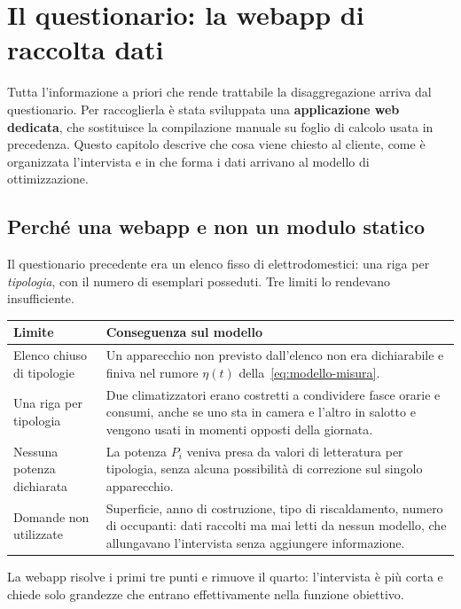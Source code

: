 \chapter{Il questionario: la webapp di raccolta dati}
\label{ch:questionario}

Tutta l'informazione a priori che rende trattabile la disaggregazione arriva dal questionario.
Per raccoglierla è stata sviluppata una \textbf{applicazione web dedicata}, che sostituisce la
compilazione manuale su foglio di calcolo usata in precedenza. Questo capitolo descrive che cosa
viene chiesto al cliente, come è organizzata l'intervista e in che forma i dati arrivano al
modello di ottimizzazione.

\section{Perché una webapp e non un modulo statico}

Il questionario precedente era un elenco fisso di elettrodomestici: una riga per
\emph{tipologia}, con il numero di esemplari posseduti. Tre limiti lo rendevano insufficiente.

\begin{center}
\begin{tabularx}{\textwidth}{@{}l X@{}}
\toprule
\textbf{Limite} & \textbf{Conseguenza sul modello} \\
\midrule
Elenco chiuso di tipologie
& Un apparecchio non previsto dall'elenco non era dichiarabile e finiva nel rumore $\eta(t)$
  della~\eqref{eq:modello-misura}. \\
\addlinespace
Una riga per tipologia
& Due climatizzatori erano costretti a condividere fasce orarie e consumi, anche se uno sta in
  camera e l'altro in salotto e vengono usati in momenti opposti della giornata. \\
\addlinespace
Nessuna potenza dichiarata
& La potenza $P_i$ veniva presa da valori di letteratura per tipologia, senza alcuna
  possibilità di correzione sul singolo apparecchio. \\
\addlinespace
Domande non utilizzate
& Superficie, anno di costruzione, tipo di riscaldamento, numero di occupanti: dati raccolti
  ma mai letti da nessun modello, che allungavano l'intervista senza aggiungere informazione. \\
\bottomrule
\end{tabularx}
\end{center}

La webapp risolve i primi tre punti e rimuove il quarto: l'intervista è più corta e chiede
solo grandezze che entrano effettivamente nella funzione obiettivo.

